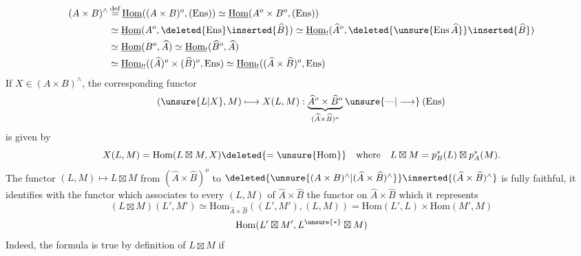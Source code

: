 \[
\begin{aligned}
(A\times B)^\wedge&\mathop{=}\limits^{\mathrm{def}}\underline{\mathrm{Hom}}((A\times B)^o,(\mathrm{Ens}))\simeq\underline{\mathrm{Hom}}(A^o\times B^o,(\mathrm{Ens}))\\
&\simeq\underline{\mathrm{Hom}}(A^o,\deleted{\mathrm{Ens}}\inserted{\widehat B})\simeq\underline{\mathrm{Hom}}_!(\widehat A^o,\deleted{\unsure{\mathrm{Ens}\,\widehat A}}\inserted{\widehat B})\\
&\simeq\underline{\mathrm{Hom}}(B^o,\widehat A)\simeq\underline{\mathrm{Hom}}_!(\widehat B^o,\widehat A)\\
&\simeq\underline{\mathrm{Hom}}_{!!}((\widehat A)^o\times(\widehat B)^o,\mathrm{Ens})\simeq\underline{\mathrm{Hom}}_!((\widehat A\times\widehat B)^o,\mathrm{Ens})
\end{aligned}
\]
If $X\in(A\times B)^\wedge$, the  corresponding functor
\[
(\unsure{L|X},M)\longmapsto X(L,M):\underset{(\widehat A\times\widehat B)^o}{\underbrace{\widehat A^o\times\widehat B^o}}\mathbin{\unsure{\text{---}|\longrightarrow}}(\mathrm{Ens})
\]
is given by
\[
X(L,M)=\mathrm{Hom}(L\boxtimes M,X)\deleted{=\unsure{\mathrm{Hom}}}\quad\text{where}\quad L\boxtimes M=p_B^*(L)\boxtimes p_A^*(M).
\]
 The functor $(L,M)\longmapsto L\boxtimes M$ from $(\widehat A\times\widehat B)^o$ to $\deleted{\unsure{(A\times B)^\wedge|(\widehat A\times\widehat B)^\wedge}}\inserted{(\widehat A\times\widehat B)^\wedge}$ is fully faithful, it identifies with the functor which associates to every  $(L,M)$ of $\widehat A\times\widehat B$ the
 functor  on $\widehat A\times\widehat B$ which it represents
\[
(L\boxtimes M)(L',M')\simeq\mathrm{Hom}_{\widehat A\times\widehat B}((L',M'),(L,M))=\mathrm{Hom}(L',L)\times\mathrm{Hom}(M',M)
\]
\[
\mathrm{Hom}(L'\boxtimes M',L^{\unsure{*}}\boxtimes M)
\]
Indeed, the formula is true by definition of $L\boxtimes M$ if 

